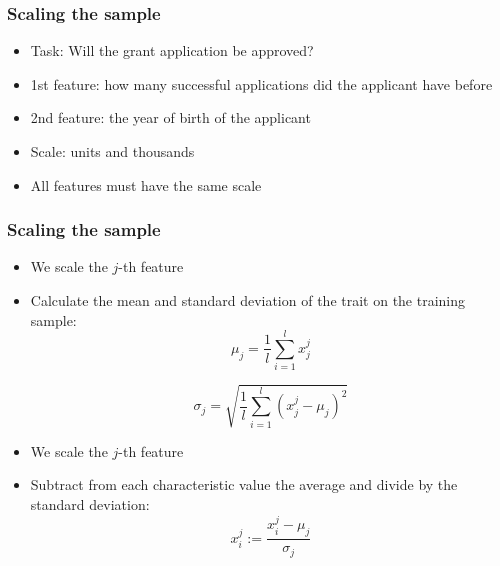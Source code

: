 \documentclass[default]{beamer}
\begin{document}
	\begin{frame}	
		\frametitle{Scaling the sample}
		
		\begin{itemize}
			\item Task: Will the grant application be approved?
			\item 1st feature: how many successful applications did the applicant have before
			\item 2nd feature: the year of birth of the applicant
			\item Scale: units and thousands
			\item All features must have the same scale
		\end{itemize}
	\end{frame}

	\begin{frame}	
		\frametitle{Scaling the sample}
		
		\begin{itemize}
			\item We scale the $j$-th feature
			\item Calculate the mean and standard deviation of the trait on the training sample:
			\[
				\mu_j=\frac{1}{l}\sum_{i=1}^lx_j^j
			\]
			
			\[
				\sigma_j=\sqrt{\frac{1}{l}\sum_{i=1}^l(x_j^j-\mu_j)^2}
			\]		
			\item We scale the $j$-th feature
			\item Subtract from each characteristic value the average and divide by the standard deviation:	
			\[
				x_i^j:=\frac{x_i^j-\mu_j}{\sigma_j}
			\]
		\end{itemize}
	\end{frame}
\end{document}
